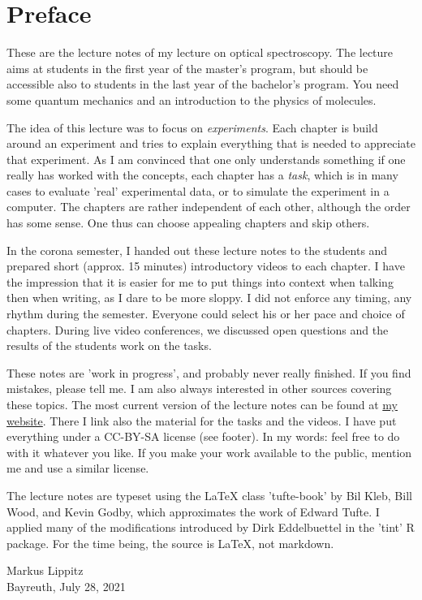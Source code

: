 \renewcommand{\lastmod}{\ \ }
\renewcommand{\chapterauthors}{\ \ }

\chapter*{Preface}


These are the lecture notes of my lecture on optical spectroscopy. The lecture aims at students in the first year of the master's program, but should be accessible also to students in the last year of the bachelor's program. You need some quantum mechanics and an introduction to the physics of molecules.

The idea of this lecture was to focus on \emph{experiments}. Each chapter is build around an experiment and tries to explain everything that is needed to appreciate that experiment. As I am convinced that one only understands something if one really has worked with the concepts, each chapter has a \emph{task}, which is in many cases to evaluate 'real' experimental data, or to simulate the experiment in a computer. The chapters are rather independent of each other, although the order has some sense. One thus can choose appealing chapters and skip others.

In the corona semester, I handed out these lecture notes to the students and prepared short (approx. 15 minutes) introductory videos to each chapter. I have the impression that it is easier for me to put things into context when talking then when writing, as I dare to be more sloppy. I did not enforce any timing, any rhythm during the semester. Everyone could select his or her pace and choice of chapters. During live video conferences, we discussed open questions and the results of the students work on the tasks.

These notes are 'work in progress', and probably never really finished. If you find mistakes, please tell me. I am also always interested in other sources covering these topics.
The most current version of the lecture notes can be found at 
\href{http://www.ep3.uni-bayreuth.de/lecturenotes}{my website}. There I link also the material for the tasks and the videos. I have put everything under a CC-BY-SA license (see footer). In my words: feel free to do with it whatever you like. If you make your work available to the public, mention me and use a similar license. 


The lecture notes are typeset using the LaTeX class 'tufte-book' by Bil Kleb, Bill Wood, and Kevin Godby, which  approximates the work of Edward Tufte. I applied many of the modifications introduced by Dirk Eddelbuettel in the 'tint' R package. For the time being, the source is LaTeX, not markdown.

\vspace{2\baselineskip}

Markus Lippitz \\ Bayreuth, July 28, 2021

